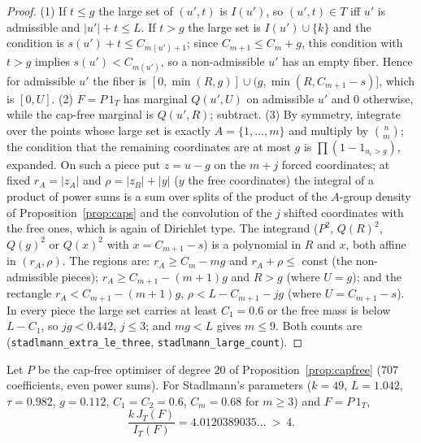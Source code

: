 \begin{proof}
(1) If $t\le g$ the large set of $(u',t)$ is $I(u')$, so $(u',t)\in T$ iff
$u'$ is admissible and $|u'|+t\le L$. If $t>g$ the large set is
$I(u')\cup\{k\}$ and the condition is $s(u')+t\le C_{m(u')+1}$; since
$C_{m+1}\le C_m+g$, this condition with $t>g$ implies
$s(u')<C_{m(u')}$, so a non-admissible $u'$ has an empty fiber. Hence for
admissible $u'$ the fiber is $[0,\min(R,g)]\cup(g,\min(R,C_{m+1}-s)]$, which
is $[0,U]$. (2) $F=P\,1_T$ has marginal $Q(u',U)$ on admissible $u'$ and $0$
otherwise, while the cap-free marginal is $Q(u',R)$; subtract. (3) By symmetry,
integrate over the points whose large set is exactly $A=\{1,\dots,m\}$ and
multiply by $\binom nm$; the condition that the remaining coordinates are at
most $g$ is $\prod(1-1_{u_i>g})$, expanded. On such a piece put $z=u-g$ on the
$m+j$ forced coordinates; at fixed $r_A=|z_A|$ and $\rho=|z_B|+|y|$ ($y$ the
free coordinates) the integral of a product of power sums is a sum over splits
of the product of the $A$-group density of Proposition~\ref{prop:caps} and the
convolution of the $j$ shifted coordinates with the free ones, which is again
of Dirichlet type. The integrand ($P^2$, $Q(R)^2$, $Q(g)^2$ or $Q(x)^2$ with
$x=C_{m+1}-s$) is a polynomial in $R$ and $x$, both affine in
$(r_A,\rho)$. The regions are: $r_A\ge C_m-mg$ and $r_A+\rho\le$ const
(the non-admissible pieces); $r_A\ge C_{m+1}-(m+1)g$ and $R>g$ (where $U=g$);
and the rectangle $r_A<C_{m+1}-(m+1)g$, $\rho<L-C_{m+1}-jg$ (where
$U=C_{m+1}-s$). In every piece the large set carries at least $C_1=0.6$ or
the free mass is below $L-C_1$, so $jg<0.442$, $j\le3$; and $mg<L$ gives
$m\le9$. Both counts are 
(\texttt{stadlmann\_extra\_le\_three}, \texttt{stadlmann\_large\_count}).
\end{proof}

\begin{theorem}\label{thm:capped-exact}
Let $P$ be the cap-free optimiser of degree $20$ of
Proposition~\ref{prop:capfree} ($707$ coefficients, even power sums). For
Stadlmann's parameters ($k=49$, $L=1.042$, $\tau=0.982$, $g=0.112$,
$C_1=C_2=0.6$, $C_m=0.68$ for $m\ge3$) and $F=P\,1_T$,
\[
\frac{k\,J_T(F)}{I_T(F)}=4.0120389035\ldots\ >\ 4 .
\]
\end{theorem}

